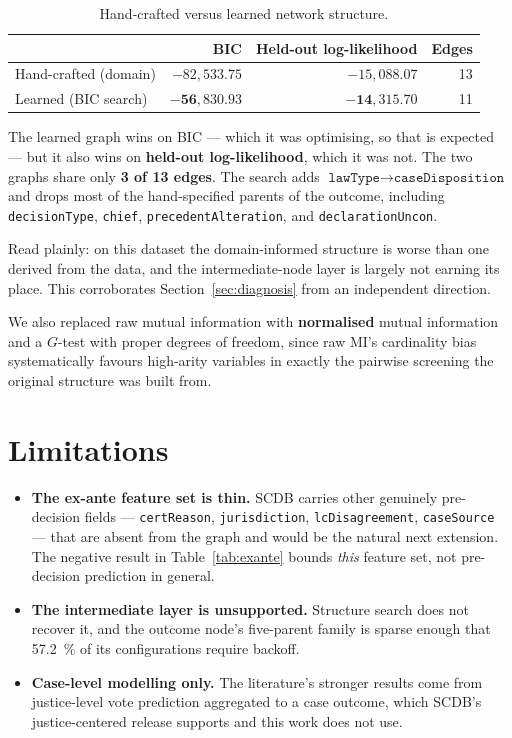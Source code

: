 \documentclass[11pt]{article}
\newcommand{\code}[1]{\texttt{#1}}
\begin{document}
\begin{table}[t]
\centering
\caption{Hand-crafted versus learned network structure.}
\label{tab:structure}
\begin{tabular}{lrrr}
\toprule
 & BIC & Held-out log-likelihood & Edges \\
\midrule
Hand-crafted (domain) & $-82{,}533.75$ & $-15{,}088.07$ & 13 \\
Learned (BIC search)  & $\mathbf{-56{,}830.93}$ & $\mathbf{-14{,}315.70}$ & 11 \\
\bottomrule
\end{tabular}
\end{table}

The learned graph wins on BIC --- which it was optimising, so that is expected
--- but it also wins on \textbf{held-out log-likelihood}, which it was not. The
two graphs share only \textbf{3 of 13 edges}. The search adds
$\code{lawType} \rightarrow \code{caseDisposition}$ and drops most of the
hand-specified parents of the outcome, including \code{decisionType},
\code{chief}, \code{precedentAlteration}, and \code{declarationUncon}.

Read plainly: on this dataset the domain-informed structure is worse than one
derived from the data, and the intermediate-node layer is largely not earning
its place. This corroborates Section~\ref{sec:diagnosis} from an independent
direction.

We also replaced raw mutual information with \textbf{normalised} mutual
information and a $G$-test with proper degrees of freedom, since raw MI's
cardinality bias systematically favours high-arity variables in exactly the
pairwise screening the original structure was built from.

\section{Limitations}

\begin{itemize}
  \item \textbf{The ex-ante feature set is thin.} SCDB carries other genuinely
    pre-decision fields --- \code{certReason}, \code{jurisdiction},
    \code{lcDisagreement}, \code{caseSource} --- that are absent from the graph
    and would be the natural next extension. The negative result in
    Table~\ref{tab:exante} bounds \emph{this} feature set, not pre-decision
    prediction in general.
  \item \textbf{The intermediate layer is unsupported.} Structure search does
    not recover it, and the outcome node's five-parent family is sparse enough
    that \SI{57.2}{\percent} of its configurations require backoff.
  \item \textbf{Case-level modelling only.} The literature's stronger results
    come from justice-level vote prediction aggregated to a case outcome, which
    SCDB's justice-centered release supports and this work does not use.
\end{itemize}
\end{document}
